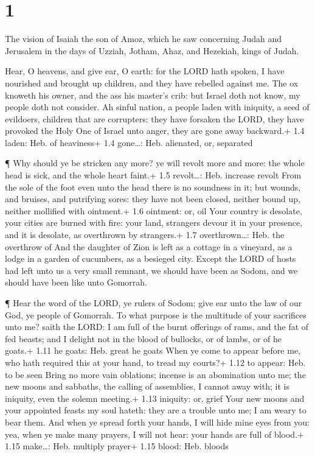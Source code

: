 \hypertarget{section}{%
\section{1}\label{section}}

 The vision of Isaiah the son of Amoz, which he saw
concerning Judah and Jerusalem in the days of Uzziah, Jotham, Ahaz, and
Hezekiah, kings of Judah.

 Hear, O heavens, and give ear, O earth: for the LORD hath
spoken, I have nourished and brought up children, and they have rebelled
against me.  The ox knoweth his owner, and the ass his
master's crib: but Israel doth not know, my people doth not consider.
 Ah sinful nation, a people laden with iniquity, a seed of
evildoers, children that are corrupters: they have forsaken the LORD,
they have provoked the Holy One of Israel unto anger, they are gone away
backward.+ 1.4 laden: Heb. of heaviness+ 1.4 gone\ldots: Heb. alienated,
or, separated

 ¶ Why should ye be stricken any more? ye will revolt more
and more: the whole head is sick, and the whole heart faint.+ 1.5
revolt\ldots: Heb. increase revolt  From the sole of the
foot even unto the head there is no soundness in it; but wounds, and
bruises, and putrifying sores: they have not been closed, neither bound
up, neither mollified with ointment.+ 1.6 ointment: or, oil 
Your country is desolate, your cities are burned with fire: your land,
strangers devour it in your presence, and it is desolate, as overthrown
by strangers.+ 1.7 overthrown\ldots: Heb. the overthrow of 
And the daughter of Zion is left as a cottage in a vineyard, as a lodge
in a garden of cucumbers, as a besieged city.  Except the
LORD of hosts had left unto us a very small remnant, we should have been
as Sodom, and we should have been like unto Gomorrah.

 ¶ Hear the word of the LORD, ye rulers of Sodom; give ear
unto the law of our God, ye people of Gomorrah.  To what
purpose is the multitude of your sacrifices unto me? saith the LORD: I
am full of the burnt offerings of rams, and the fat of fed beasts; and I
delight not in the blood of bullocks, or of lambs, or of he goats.+ 1.11
he goats: Heb. great he goats  When ye come to appear
before me, who hath required this at your hand, to tread my courts?+
1.12 to appear: Heb. to be seen  Bring no more vain
oblations; incense is an abomination unto me; the new moons and
sabbaths, the calling of assemblies, I cannot away with; it is iniquity,
even the solemn meeting.+ 1.13 iniquity: or, grief  Your
new moons and your appointed feasts my soul hateth: they are a trouble
unto me; I am weary to bear them.  And when ye spread forth
your hands, I will hide mine eyes from you: yea, when ye make many
prayers, I will not hear: your hands are full of blood.+ 1.15
make\ldots: Heb. multiply prayer+ 1.15 blood: Heb. bloods

